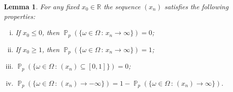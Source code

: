 \documentclass[a4paper,12pt]{article}
\newtheorem{lemma}{Lemma}[section]
\DeclareMathOperator{\prob}{\mathbb{P}}
\begin{document}
\begin{lemma}
\label{lemma:properties3}
For any fixed $x_0 \in \mathbb{R}$ the sequence $(x_n)$ satisfies the following properties:
\begin{enumerate}[(i)]
\item If $x_0 \leq 0$, then $\prob_p(\{\omega \in \Omega \,:\, x_n \to \infty\}) = 0$;
\item If $x_0 \geq 1$, then $\prob_p(\{\omega \in \Omega \,:\, x_n \to \infty\}) = 1$;
\item $\prob_p(\{\omega \in \Omega \,:\, (x_n) \subseteq [0,1]\}) = 0$;
\item $\prob_p(\{\omega \in \Omega \,:\, (x_n) \to -\infty\}) = 1-\prob_p(\{\omega \in \Omega \,:\, (x_n) \to \infty\})$.
\end{enumerate}
\end{lemma}
\end{document}
